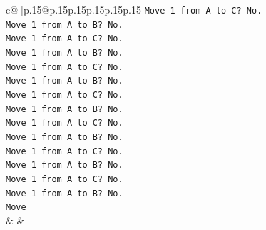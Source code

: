 \documentclass{article}
\begin{document}
{\begin{supertabular}{c@{$\;$}|p{.15\linewidth}@{}p{.15\linewidth}p{.15\linewidth}p{.15\linewidth}p{.15\linewidth}p{.15\linewidth}}
{{{\texttt{Move 1 from A to C? No.} \\
\texttt{Move 1 from A to B? No.} \\
\texttt{Move 1 from A to C? No.} \\
\texttt{Move 1 from A to B? No.} \\
\texttt{Move 1 from A to C? No.} \\
\texttt{Move 1 from A to B? No.} \\
\texttt{Move 1 from A to C? No.} \\
\texttt{Move 1 from A to B? No.} \\
\texttt{Move 1 from A to C? No.} \\
\texttt{Move 1 from A to B? No.} \\
\texttt{Move 1 from A to C? No.} \\
\texttt{Move 1 from A to B? No.} \\
\texttt{Move 1 from A to C? No.} \\
\texttt{Move 1 from A to B? No.} \\
\texttt{Move} \\
            }
        }
    }
    & & \\ \\


\end{supertabular}}
\end{document}
